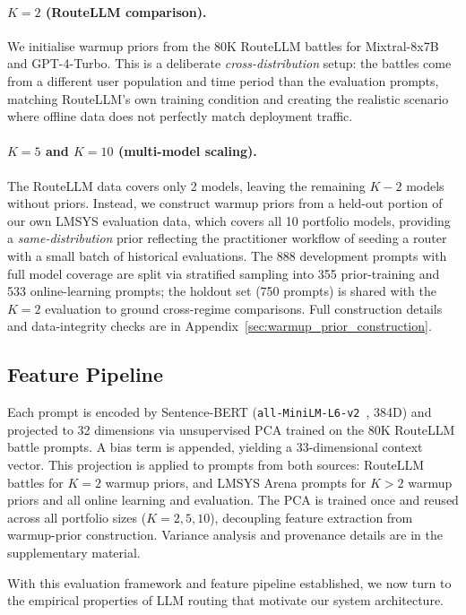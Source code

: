 \paragraph{$K{=}2$ (RouteLLM comparison).}
We initialise warmup priors from the 80K RouteLLM battles for Mixtral-8x7B and GPT-4-Turbo.
This is a deliberate \emph{cross-distribution} setup: the battles come from a different user population and time period than the evaluation prompts, matching RouteLLM's own training condition and creating the realistic scenario where offline data does not perfectly match deployment traffic.

\paragraph{$K{=}5$ and $K{=}10$ (multi-model scaling).}
The RouteLLM data covers only 2 models, leaving the remaining $K{-}2$ models without priors.
Instead, we construct warmup priors from a held-out portion of our own LMSYS evaluation data, which covers all 10 portfolio models, providing a \emph{same-distribution} prior reflecting the practitioner workflow of seeding a router with a small batch of historical evaluations.
The 888 development prompts with full model coverage are split via stratified sampling into 355 prior-training and 533 online-learning prompts; the holdout set (750 prompts) is shared with the $K{=}2$ evaluation to ground cross-regime comparisons.
Full construction details and data-integrity checks are in Appendix~\ref{sec:warmup_prior_construction}.

\subsection{Feature Pipeline}
\label{sec:feature_pipeline}

Each prompt is encoded by Sentence-BERT (\texttt{all-MiniLM-L6-v2}~\cite{reimers2019sentence}, 384D) and projected to 32 dimensions via unsupervised PCA trained on the 80K RouteLLM battle prompts.
A bias term is appended, yielding a 33-dimensional context vector.
This projection is applied to prompts from both sources: RouteLLM battles for $K{=}2$ warmup priors, and LMSYS Arena prompts for $K{>}2$ warmup priors and all online learning and evaluation.
The PCA is trained once and reused across all portfolio sizes ($K{=}2, 5, 10$), decoupling feature extraction from warmup-prior construction.
Variance analysis and provenance details are in the supplementary material.

With this evaluation framework and feature pipeline established, we now turn to the empirical properties of LLM routing that motivate our system architecture.

